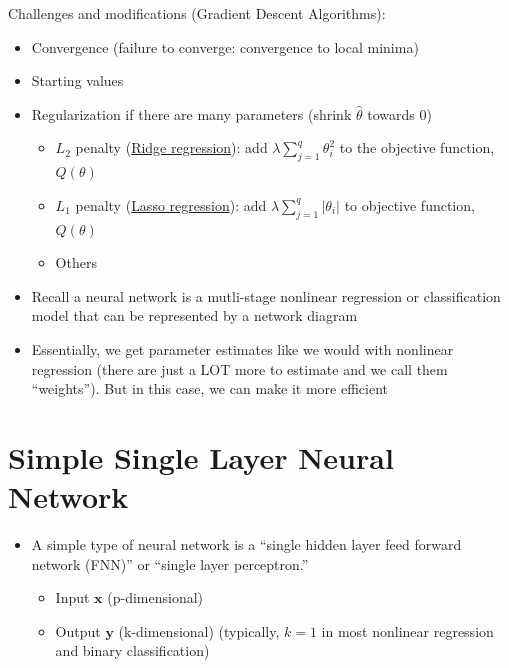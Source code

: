 \documentclass[
]{book}
\begin{document}
Challenges and modifications (Gradient Descent Algorithms):

\begin{itemize}
\item
  Convergence (failure to converge: convergence to local minima)
\item
  Starting values
\item
  Regularization if there are many parameters (shrink \(\hat{\theta}\) towards 0)

  \begin{itemize}
  \item
    \(L_2\) penalty (\protect\hyperlink{ridge-regression}{Ridge regression}): add \(\lambda \sum_{j=1}^q \theta_i^2\) to the objective function, \(Q(\theta)\)
  \item
    \(L_1\) penalty (\protect\hyperlink{lasso-regression}{Lasso regression}): add \(\lambda \sum_{j=1}^q |\theta_i|\) to objective function, \(Q(\theta)\)
  \item
    Others
  \end{itemize}
\end{itemize}

\begin{itemize}
\item
  Recall a neural network is a mutli-stage nonlinear regression or classification model that can be represented by a network diagram
\item
  Essentially, we get parameter estimates like we would with nonlinear regression (there are just a LOT more to estimate and we call them ``weights''). But in this case, we can make it more efficient
\end{itemize}

\hypertarget{simple-single-layer-neural-network}{%
\section{Simple Single Layer Neural Network}\label{simple-single-layer-neural-network}}

\begin{itemize}
\item
  A simple type of neural network is a ``single hidden layer feed forward network (FNN)'' or ``single layer perceptron.''

  \begin{itemize}
  \item
    Input \(\mathbf{x}\) (p-dimensional)
  \item
    Output \(\mathbf{y}\) (k-dimensional) (typically, \(k = 1\) in most nonlinear regression and binary classification)
  \end{itemize}
\end{itemize}
\end{document}
